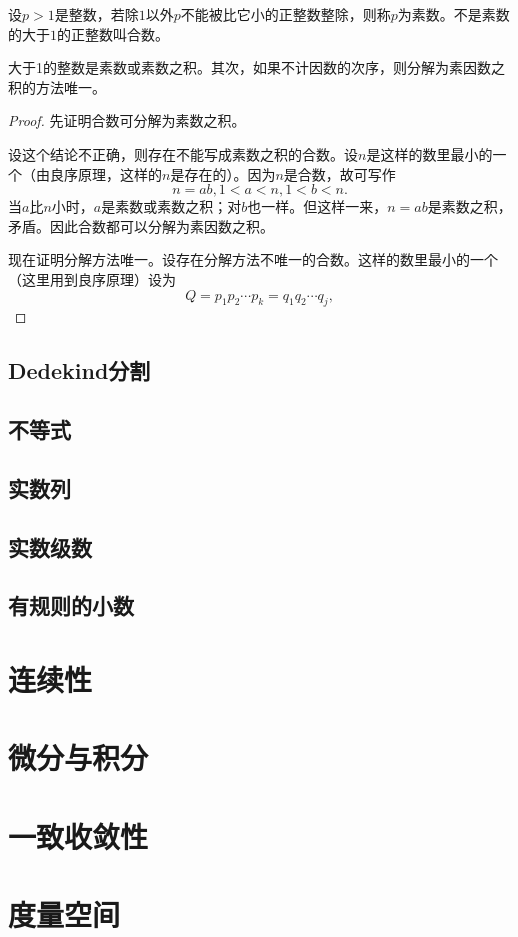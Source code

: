 \begin{definition}{}{}
设$p > 1$是整数，若除$1$以外$p$不能被比它小的正整数整除，则称$p$为素数。不是素数的大于$1$的正整数叫合数。
\end{definition}

\begin{proposition}{}{}
大于1的整数是素数或素数之积。其次，如果不计因数的次序，则分解为素因数之积的方法唯一。
\end{proposition}

\begin{proof}
先证明合数可分解为素数之积。

设这个结论不正确，则存在不能写成素数之积的合数。设$n$是这样的数里最小的一个（由良序原理，这样的$n$是存在的）。因为$n$是合数，故可写作
\[
n = ab, 1 < a < n, 1 < b < n.
\]
当$a$比$n$小时，$a$是素数或素数之积；对$b$也一样。但这样一来，$n=ab$是素数之积，矛盾。因此合数都可以分解为素因数之积。

现在证明分解方法唯一。设存在分解方法不唯一的合数。这样的数里最小的一个（这里用到良序原理）设为
\[
Q = p_1p_2\cdots p_k = q_1q_2\cdots q_j,
\]
\end{proof}

\section{Dedekind分割}\label{sec0100102}


\section{不等式}\label{sec0100103}

\section{实数列}\label{sec0100104}

\section{实数级数}\label{sec0100105}

\section{有规则的小数}\label{sec0100106}


\chapter{连续性}\label{ch01002}


\chapter{微分与积分}\label{ch01003}

\chapter{一致收敛性}\label{ch01004}

\chapter{度量空间}\label{ch01005}












